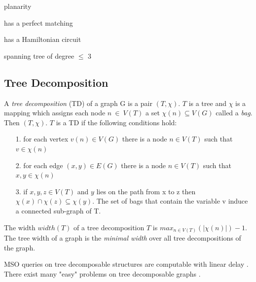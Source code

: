 \documentclass[a4paper, 12pt, bibliography=totoc]{scrartcl}
\begin{document}
planarity

has a perfect matching

has a Hamiltonian circuit

spanning tree of degree $\le$ 3



\subsection{Tree Decomposition}
A \textit{tree decomposition} (TD) of a graph G is a pair $(T, \chi)$. $T$ is a tree and $\chi$ is a mapping which assigns each node $n~\in~V(T)$ 
a set $\chi(n) \subseteq V(G)$ called a \textit{bag}. Then $(T, \chi)$. $T$ is a TD if the following conditions hold:

\begin{itemize}
	\item[1.] for each vertex $v(n) \in V(G)$ there is a node $n \in V(T)$ such that $v \in \chi(n)$
	\item[2.] for each edge $(x,y) \in E(G)$ there is a node $n\in V(T)$ such that $x,y \in\chi(n)$
	\item[3.] if $x,y,z \in V(T)$ and $y$ lies on the path from x to z then $\chi(x) \cap \chi(z) \subseteq \chi(y)$. The set of bags that contain the variable v induce a connected sub-graph of T.
\end{itemize}
The width $width(T)$ of a tree decomposition $T$ is $max_{n\in V(T)}(|\chi(n)|)-1$.
The tree width of a graph is the \textit{minimal width} over all tree decompositions of the graph. 


MSO queries on tree decomposable structures are computable with linear delay \cite{MSOQueriesGuillaume}. There exist many "easy" problems on tree decomposable graphs \cite{ARNBORG1991308}.
\end{document}
